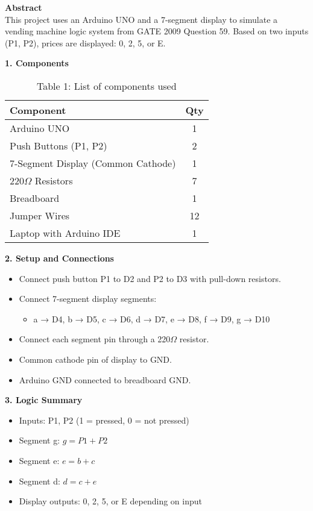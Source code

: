 \documentclass[12pt]{article}
\begin{document}
\begin{multicols}{2}

\noindent\textbf{Abstract} \\[0.5em]
This project uses an Arduino UNO and a 7-segment display to simulate a vending machine logic system from GATE 2009 Question 59. Based on two inputs (P1, P2), prices are displayed: 0, 2, 5, or E.

\vspace{1em}
\noindent\textbf{1. Components}
\begin{table}[H]
\small
\centering
\begin{tabular}{|p{4.2cm}|c|}
\hline
\textbf{Component} & \textbf{Qty} \\
\hline
Arduino UNO & 1 \\
Push Buttons (P1, P2) & 2 \\
7-Segment Display (Common Cathode) & 1 \\
220$\Omega$ Resistors & 7 \\
Breadboard & 1 \\
Jumper Wires & 12 \\
Laptop with Arduino IDE & 1 \\
\hline
\end{tabular}
\caption*{Table 1: List of components used}
\end{table}

\vspace{1em}
\noindent\textbf{2. Setup and Connections}
\begin{itemize}
    \item Connect push button P1 to D2 and P2 to D3 with pull-down resistors.
    \item Connect 7-segment display segments:
    \begin{itemize}
        \item a → D4, b → D5, c → D6, d → D7, e → D8, f → D9, g → D10
    \end{itemize}
    \item Connect each segment pin through a 220$\Omega$ resistor.
    \item Common cathode pin of display to GND.
    \item Arduino GND connected to breadboard GND.
\end{itemize}

\vspace{1em}
\noindent\textbf{3. Logic Summary}
\begin{itemize}
    \item Inputs: P1, P2 (1 = pressed, 0 = not pressed)
    \item Segment g: $g = P1 + P2$
    \item Segment e: $e = b + c$
    \item Segment d: $d = c + e$
    \item Display outputs: 0, 2, 5, or E depending on input
\end{itemize}


\end{multicols}
\end{document}
